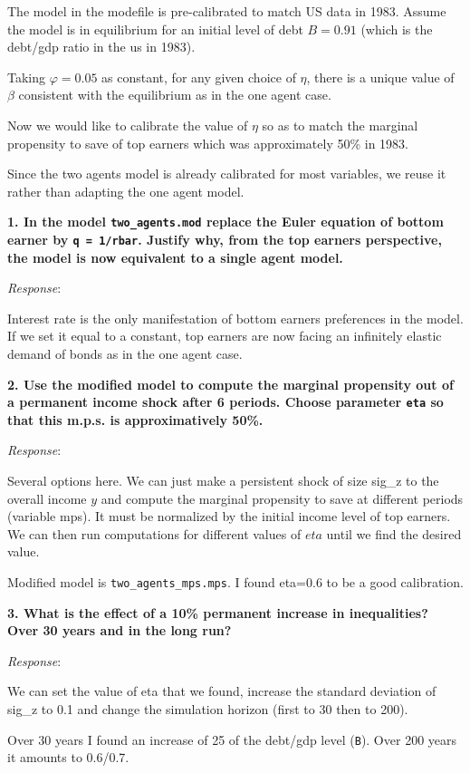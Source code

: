 \documentclass[
  letterpaper,
  DIV=11,
  numbers=noendperiod]{scrartcl}
\begin{document}
The model in the modefile is pre-calibrated to match US data in 1983.
Assume the model is in equilibrium for an initial level of debt
\(B=0.91\) (which is the debt/gdp ratio in the us in 1983).

Taking \(\varphi=0.05\) as constant, for any given choice of \(\eta\),
there is a unique value of \(\beta\) consistent with the equilibrium as
in the one agent case.

Now we would like to calibrate the value of \(\eta\) so as to match the
marginal propensity to save of top earners which was approximately 50\%
in 1983.

Since the two agents model is already calibrated for most variables, we
reuse it rather than adapting the one agent model.

\textbf{1. In the model \texttt{two\_agents.mod} replace the Euler
equation of bottom earner by \texttt{q\ =\ 1/rbar}. Justify why, from
the top earners perspective, the model is now equivalent to a single
agent model.}

\emph{Response}:

Interest rate is the only manifestation of bottom earners preferences in
the model. If we set it equal to a constant, top earners are now facing
an infinitely elastic demand of bonds as in the one agent case.

\textbf{2. Use the modified model to compute the marginal propensity out
of a permanent income shock after 6 periods. Choose parameter
\texttt{eta} so that this m.p.s. is approximatively 50\%.}

\emph{Response}:

Several options here. We can just make a persistent shock of size sig\_z
to the overall income \(y\) and compute the marginal propensity to save
at different periods (variable mps). It must be normalized by the
initial income level of top earners. We can then run computations for
different values of \(eta\) until we find the desired value.

Modified model is \texttt{two\_agents\_mps.mps}. I found eta=0.6 to be a
good calibration.

\textbf{3. What is the effect of a 10\% permanent increase in
inequalities? Over 30 years and in the long run?}

\emph{Response}:

We can set the value of eta that we found, increase the standard
deviation of sig\_z to 0.1 and change the simulation horizon (first to
30 then to 200).

Over 30 years I found an increase of 25 of the debt/gdp level
(\texttt{B}). Over 200 years it amounts to 0.6/0.7.
\end{document}
